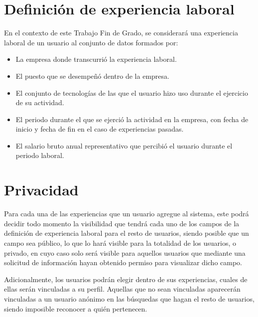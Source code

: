 \documentclass[a4paper, 12pt]{book}
\begin{document}
    \section{Definición de experiencia laboral}
    \label{sec:intro_workexperiencedefinition}
    En el contexto de este Trabajo Fin de Grado, se considerará una experiencia laboral de un usuario al conjunto de datos formados por:

    \begin{itemize}
        \item La empresa donde transcurrió la experiencia laboral.
        \item El puesto que se desempeñó dentro de la empresa.
        \item El conjunto de tecnologías de las que el usuario hizo uso durante el ejercicio de su actividad.
        \item El periodo durante el que se ejerció la actividad en la empresa, con fecha de inicio y fecha de fin en el caso de experiencias pasadas.
        \item El salario bruto anual representativo que percibió el usuario durante el periodo laboral.
    \end{itemize}


    \section{Privacidad}
    \label{sec:intro_privacity}
    Para cada una de las experiencias que un usuario agregue al sistema, este podrá decidir todo momento la visibilidad que tendrá cada uno de los campos de la definición de experiencia laboral para el resto de usuarios, siendo posible que un campo sea público, lo que lo hará visible para la totalidad de los usuarios, o privado, en cuyo caso solo será visible para aquellos usuarios que mediante una solicitud de información hayan obtenido permiso para visualizar dicho campo.

    Adicionalmente, los usuarios podrán elegir dentro de sus experiencias, cuales de ellas serán vinculadas a su perfil. Aquellas que no sean vinculadas aparecerán vinculadas a un usuario anónimo en las búsquedas que hagan el resto de usuarios, siendo imposible reconocer a quién pertenecen.
\end{document}
